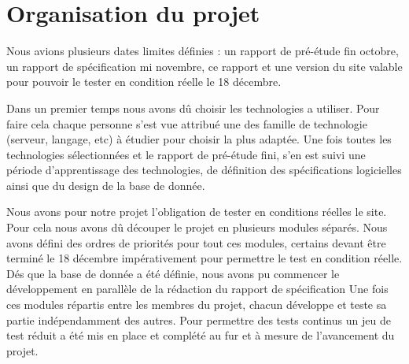 \chapter{Organisation du projet}

Nous avions plusieurs dates limites définies : un rapport de pré-étude fin octobre, un rapport de spécification mi novembre, ce rapport et une version du site valable pour pouvoir le tester en condition réelle le 18 décembre.

Dans un premier temps nous avons dû choisir les technologies a utiliser. Pour faire cela chaque personne s'est vue attribué une des famille de technologie (serveur, langage, etc) à étudier pour choisir la plus adaptée.
Une fois toutes les technologies sélectionnées et le rapport de pré-étude fini, s'en est suivi une période d'apprentissage des technologies, de définition des spécifications logicielles ainsi que du design de la base de donnée.

Nous avons pour notre projet l'obligation de tester en conditions réelles le site. Pour cela nous avons dû découper le projet en plusieurs modules séparés. Nous avons défini des ordres de priorités pour tout ces modules, certains devant être terminé le 18 décembre impérativement pour permettre le test en condition réelle.
Dés que la base de donnée a été définie, nous avons pu commencer le développement en parallèle de la rédaction du rapport de spécification
Une fois ces modules répartis entre les membres du projet, chacun développe et teste sa partie indépendamment des autres.
Pour permettre des tests continus un jeu de test réduit a été mis en place et complété au fur et à mesure de l'avancement du projet.
